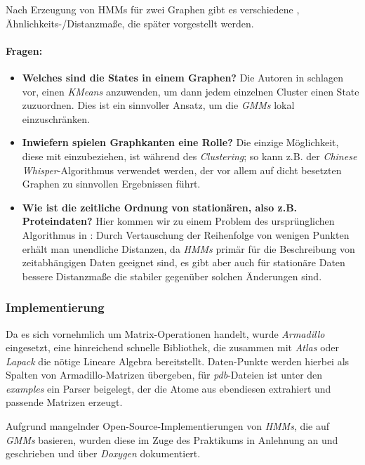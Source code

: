 \documentclass{DEarticle}
\begin{document}
Nach Erzeugung von HMMs für zwei Graphen gibt es verschiedene \cite{randomwalk}, \cite{comp} Ähnlichkeits-/Distanzmaße,
die später vorgestellt werden.


\paragraph{Fragen:}
\begin{itemize}
\item \textbf{Welches sind die States in einem Graphen?} Die Autoren in \cite{comp} schlagen vor, einen \emph{KMeans}
anzuwenden, um dann jedem einzelnen Cluster einen State \label{states} zuzuordnen. Dies ist ein sinnvoller Ansatz, um die \emph{GMMs}
lokal einzuschränken.
\item \textbf{Inwiefern spielen Graphkanten eine Rolle?} Die einzige Möglichkeit, diese mit einzubeziehen, ist während
des \emph{Clustering}; so kann z.B. der \cite{chinese} \emph{Chinese Whisper}-Algorithmus verwendet werden, der
vor allem auf dicht besetzten Graphen zu sinnvollen Ergebnissen führt.
\item \textbf{Wie ist die zeitliche Ordnung von stationären, also z.B. Proteindaten?} Hier kommen wir zu einem Problem des ursprünglichen
Algorithmus in \cite{comp}: Durch Vertauschung der Reihenfolge von wenigen Punkten erhält man unendliche Distanzen, da
\emph{HMMs} primär für die Beschreibung von zeitabhängigen Daten geeignet sind, es gibt aber auch für stationäre Daten
bessere Distanzmaße die stabiler gegenüber solchen Änderungen sind.
\end{itemize}

\subsubsection{Implementierung}
Da es sich vornehmlich um Matrix-Operationen handelt, wurde \emph{Armadillo} \cite{armadillo} eingesetzt, eine
hinreichend schnelle Bibliothek, die zusammen mit \emph{Atlas} oder \emph{Lapack} die nötige Lineare Algebra
bereitstellt.
Daten-Punkte werden hierbei als Spalten von Armadillo-Matrizen übergeben, für \emph{pdb}-Dateien ist unter den \emph{examples}
ein Parser beigelegt, der die Atome aus ebendiesen extrahiert und passende Matrizen erzeugt.

Aufgrund mangelnder Open-Source-Implementierungen von \emph{HMMs}, die auf \emph{GMMs} basieren, wurden diese im Zuge
des Praktikums in Anlehnung an \cite{emgmm} und \cite{rabin} geschrieben und über \emph{Doxygen} dokumentiert.
\end{document}
